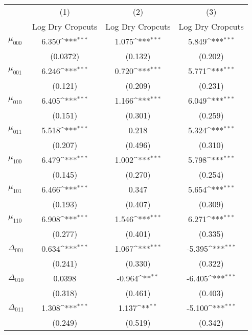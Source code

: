 {
\def\sym#1{\ifmmode^{#1}\else\(^{#1}\)\fi}
\begin{tabular}{l*{3}{c}}
\hline\hline
          &\multicolumn{1}{c}{(1)}&\multicolumn{1}{c}{(2)}&\multicolumn{1}{c}{(3)}\\
          &\multicolumn{1}{c}{Log Dry Cropcuts}&\multicolumn{1}{c}{Log Dry Cropcuts}&\multicolumn{1}{c}{Log Dry Cropcuts}\\
\hline
$\mu_{000}$&    6.350\sym{***}&    1.075\sym{***}&    5.849\sym{***}\\
          & (0.0372)         &  (0.132)         &  (0.202)         \\
$\mu_{001}$&    6.246\sym{***}&    0.720\sym{***}&    5.771\sym{***}\\
          &  (0.121)         &  (0.209)         &  (0.231)         \\
$\mu_{010}$&    6.405\sym{***}&    1.166\sym{***}&    6.049\sym{***}\\
          &  (0.151)         &  (0.301)         &  (0.259)         \\
$\mu_{011}$&    5.518\sym{***}&    0.218         &    5.324\sym{***}\\
          &  (0.207)         &  (0.496)         &  (0.310)         \\
$\mu_{100}$&    6.479\sym{***}&    1.002\sym{***}&    5.798\sym{***}\\
          &  (0.145)         &  (0.270)         &  (0.254)         \\
$\mu_{101}$&    6.466\sym{***}&    0.347         &    5.654\sym{***}\\
          &  (0.193)         &  (0.407)         &  (0.309)         \\
$\mu_{110}$&    6.908\sym{***}&    1.546\sym{***}&    6.271\sym{***}\\
          &  (0.277)         &  (0.401)         &  (0.335)         \\
$\Delta_{001}$&    0.634\sym{***}&    1.067\sym{***}&   -5.395\sym{***}\\
          &  (0.241)         &  (0.330)         &  (0.322)         \\
$\Delta_{010}$&   0.0398         &   -0.964\sym{**} &   -6.405\sym{***}\\
          &  (0.318)         &  (0.461)         &  (0.403)         \\
$\Delta_{011}$&    1.308\sym{***}&    1.137\sym{**} &   -5.100\sym{***}\\
          &  (0.249)         &  (0.519)         &  (0.342)         \\

\end{tabular}}
